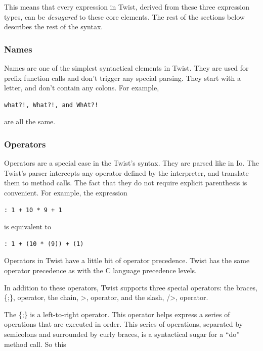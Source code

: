 This means that every expression in Twist, derived from these three expression types, can be \emph{desugared} to these core elements. The rest of the sections below describes the rest of the syntax.

\subsubsection{Names}
\label{sec:names}

Names are one of the simplest syntactical elements in Twist. They are used for prefix function calls and don't trigger any special parsing. They start with a letter, and don't contain any colons. For example, 

\begin{verbatim}
what?!, What?!, and WhAt?! 
\end{verbatim} 

are all the same.

\subsubsection{Operators}
\label{sec:operators}

Operators are a special case in the Twist's syntax. They are parsed like in Io. The Twist's parser intercepts any operator defined by the interpreter, and translate them to method calls. The fact that they do not require explicit parenthesis is convenient. For example, the expression

\begin{verbatim}
: 1 + 10 * 9 + 1
\end{verbatim}

is equivalent to

\begin{verbatim}
: 1 + (10 * (9)) + (1)
\end{verbatim}

Operators in Twist have a little  bit of operator precedence. Twist has the same operator precedence as with the C language precedence levels.

In addition to these operators, Twist supports three special operators: the braces, \{;\}, operator, the chain, >, operator, and the slash, />, operator.

The \{;\} is a left-to-right operator. This operator helps express a series of operations that are executed in order. This series of operations, separated by semicolons and surrounded by curly braces, is a syntactical sugar for a ``do'' method call. So this

